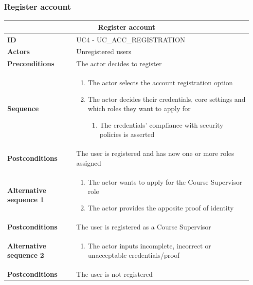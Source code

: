 \subsubsection{Register account}
\begin{tabular}{|m{2.5cm}|m{8cm}|}
	\hline
	\multicolumn{2}{|c|}{Register account} \\
	\hline
	\textbf{ID} & UC4 - UC\_ACC\_REGISTRATION \\
	\hline
	\textbf{Actors} & Unregistered users \\
	\hline
	\textbf{Preconditions} & The actor decides to register \\
	\hline
	\textbf{Sequence} & 
	\begin{enumerate}
		\item The actor selects the account registration option
		\item The actor decides their credentials, core settings and which roles they want to apply for
		\begin{enumerate}
			\item The credentials’ compliance with security policies is asserted
		\end{enumerate}
	\end{enumerate} \\
	\hline
	\textbf{Postconditions} & The user is registered and has now one or more roles assigned \\
	\hline
	
	\textbf{Alternative sequence 1} & 
	\begin{enumerate}
		\item The actor wants to apply for the Course Supervisor role
		\item The actor provides the apposite proof of identity
	\end{enumerate} \\
	\hline
	\textbf{Postconditions} & The user is registered as a Course Supervisor \\
	\hline
	
	\textbf{Alternative sequence 2} & 
	\begin{enumerate}
		\item The actor inputs incomplete, incorrect or unacceptable credentials/proof
	\end{enumerate} \\
	\hline
	\textbf{Postconditions} & The user is not registered \\
	\hline
\end{tabular}

